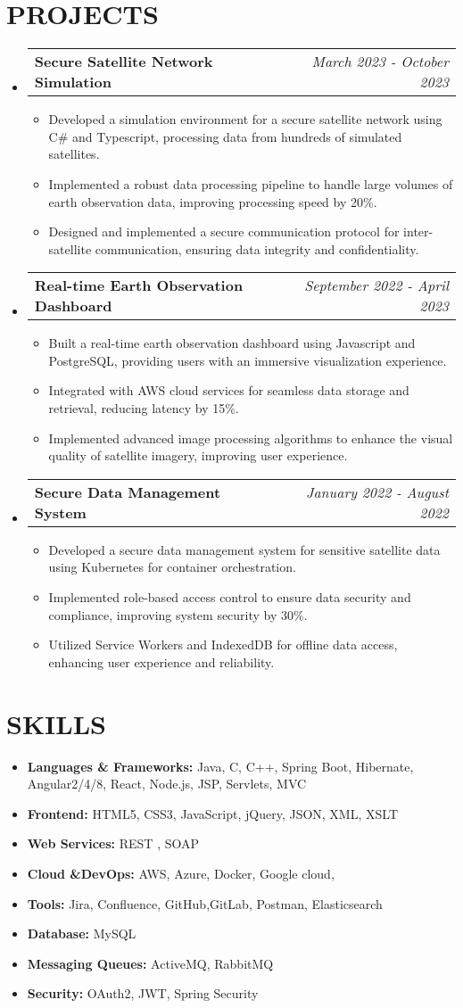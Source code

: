 \documentclass[letterpaper,11pt]{article}
\makeatletter
\newcommand{\resumeItem}[1]{\item\small{{#1 \vspace{-3pt}}}}
\newcommand{\resumeProjectHeading}[2]{\item\begin{tabular*}{0.97\textwidth}{l@{\extracolsep{\fill}}r}\small#1 & #2 \\ \end{tabular*}\vspace{-7pt}}
\newcommand{\resumeSubHeadingListStart}{\begin{itemize}[leftmargin=0.15in, label={}]}
\newcommand{\resumeSubHeadingListEnd}{\end{itemize}}
\newcommand{\resumeItemListStart}{\begin{itemize}}
\newcommand{\resumeItemListEnd}{\end{itemize}\vspace{-5pt}}
\makeatother
\begin{document}
\section{{\fontsize{9pt}{20pt}\selectfont \textbf{PROJECTS}}}\resumeSubHeadingListStart
\resumeProjectHeading{\textbf{Secure Satellite Network Simulation}}{\textit{March 2023 - October 2023}}
\resumeItemListStart
\resumeItem{Developed a simulation environment for a secure satellite network using C\# and Typescript, processing data from hundreds of simulated satellites.}
\resumeItem{Implemented a robust data processing pipeline to handle large volumes of earth observation data, improving processing speed by 20\%.}
\resumeItem{Designed and implemented a secure communication protocol for inter-satellite communication, ensuring data integrity and confidentiality.}
\resumeItemListEnd\vspace{-6pt}
\resumeProjectHeading{\textbf{Real-time Earth Observation Dashboard}}{\textit{September 2022 - April 2023}}
\resumeItemListStart
\resumeItem{Built a real-time earth observation dashboard using Javascript and PostgreSQL, providing users with an immersive visualization experience.}
\resumeItem{Integrated with AWS cloud services for seamless data storage and retrieval, reducing latency by 15\%.}
\resumeItem{Implemented advanced image processing algorithms to enhance the visual quality of satellite imagery, improving user experience.}
\resumeItemListEnd\vspace{-6pt}
\resumeProjectHeading{\textbf{Secure Data Management System}}{\textit{January 2022 - August 2022}}
\resumeItemListStart
\resumeItem{Developed a secure data management system for sensitive satellite data using Kubernetes for container orchestration.}
\resumeItem{Implemented role-based access control to ensure data security and compliance, improving system security by 30\%.}
\resumeItem{Utilized Service Workers and IndexedDB for offline data access, enhancing user experience and reliability.}
\resumeItemListEnd
\resumeSubHeadingListEnd\vspace{-17pt}
\section{{\fontsize{9pt}{20pt}\selectfont \textbf{SKILLS}}}\resumeSubHeadingListStart
\resumeItem{\textbf{Languages \& Frameworks:} Java, C, C++, Spring Boot, Hibernate, Angular2/4/8, React, Node.js, JSP, Servlets, MVC}\vspace{-7pt}
\resumeItem{\textbf{Frontend:} HTML5, CSS3, JavaScript, jQuery, JSON, XML, XSLT}\vspace{-7pt}
\resumeItem{\textbf{Web Services:} REST , SOAP}\vspace{-7pt}
\resumeItem{\textbf{Cloud \&DevOps:} AWS, Azure, Docker, Google cloud,}\vspace{-7pt}
\resumeItem{\textbf{Tools:} Jira, Confluence, GitHub,GitLab, Postman, Elasticsearch}\vspace{-7pt}
\resumeItem{\textbf{Database:} MySQL}\vspace{-7pt}
\resumeItem{\textbf{Messaging Queues:} ActiveMQ, RabbitMQ}\vspace{-7pt}
\resumeItem{\textbf{Security:} OAuth2, JWT, Spring Security}
\resumeSubHeadingListEnd\vspace{-10pt}
\end{document}
